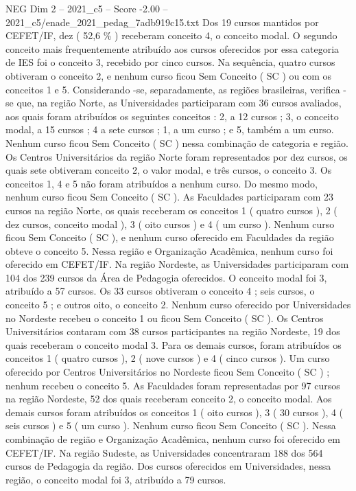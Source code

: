 \begin{textsample}{NEG Dim 2 – 2021\_c5 – Score -2.00 – 2021\_c5/enade\_2021\_pedag\_7adb919c15.txt}
Dos 19 cursos mantidos por CEFET/IF, dez ( 52,6 \% ) receberam conceito 4, o conceito modal.
O segundo conceito mais frequentemente atribuído aos cursos oferecidos por essa categoria de IES foi o conceito 3, recebido por cinco cursos.
Na sequência, quatro cursos obtiveram o conceito 2, e nenhum curso ficou Sem Conceito ( SC ) ou com os conceitos 1 e 5.
Considerando -se, separadamente, as regiões brasileiras, verifica -se que, na região Norte, as Universidades participaram com 36 cursos avaliados, aos quais foram atribuídos os seguintes conceitos : 2, a 12 cursos ; 3, o conceito modal, a 15 cursos ; 4 a sete cursos ; 1, a um curso ; e 5, também a um curso.
Nenhum curso ficou Sem Conceito ( SC ) nessa combinação de categoria e região.
Os Centros Universitários da região Norte foram representados por dez cursos, os quais sete obtiveram conceito 2, o valor modal, e três cursos, o conceito 3.
Os conceitos 1, 4 e 5 não foram atribuídos a nenhum curso.
Do mesmo modo, nenhum curso ficou Sem Conceito ( SC ).
As Faculdades participaram com 23 cursos na região Norte, os quais receberam os conceitos 1 ( quatro cursos ), 2 ( dez cursos, conceito modal ), 3 ( oito cursos ) e 4 ( um curso ).
Nenhum curso ficou Sem Conceito ( SC ), e nenhum curso oferecido em Faculdades da região obteve o conceito 5.
Nessa região e Organização Acadêmica, nenhum curso foi oferecido em CEFET/IF.
Na região Nordeste, as Universidades participaram com 104 dos 239 cursos da Área de Pedagogia oferecidos.
O conceito modal foi 3, atribuído a 57 cursos.
Os 33 cursos obtiveram o conceito 4 ; seis cursos, o conceito 5 ; e outros oito, o conceito 2.
Nenhum curso oferecido por Universidades no Nordeste recebeu o conceito 1 ou ficou Sem Conceito ( SC ).
Os Centros Universitários contaram com 38 cursos participantes na região Nordeste, 19 dos quais receberam o conceito modal 3.
Para os demais cursos, foram atribuídos os conceitos 1 ( quatro cursos ), 2 ( nove cursos ) e 4 ( cinco cursos ).
Um curso oferecido por Centros Universitários no Nordeste ficou Sem Conceito ( SC ) ; nenhum recebeu o conceito 5.
As Faculdades foram representadas por 97 cursos na região Nordeste, 52 dos quais receberam conceito 2, o conceito modal.
Aos demais cursos foram atribuídos os conceitos 1 ( oito cursos ), 3 ( 30 cursos ), 4 ( seis cursos ) e 5 ( um curso ).
Nenhum curso ficou Sem Conceito ( SC ).
Nessa combinação de região e Organização Acadêmica, nenhum curso foi oferecido em CEFET/IF.
Na região Sudeste, as Universidades concentraram 188 dos 564 cursos de Pedagogia da região.
Dos cursos oferecidos em Universidades, nessa região, o conceito modal foi 3, atribuído a 79 cursos.

\end{textsample}
